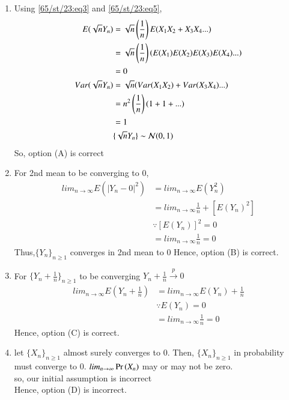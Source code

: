 \documentclass[journal,12pt,Twocolumn]{IEEEtran}
\theoremstyle{remark}
\begin{document}
\begin{enumerate}[label=(\Alph*)]
\item Using \eqref{65/st/23:eq3} and \eqref{65/st/23:eq5},
\begin{align}
E(\sqrt{n}Y_n) &= \sqrt{n}\left(\frac{1}{n}\right)E(X_1X_2+X_3X_4...) \\
&= \sqrt{n}\left(\frac{1}{n}\right)\left(E(X_1)E(X_2)E(X_3)E(X_4)...\right) \\
&= 0 \\
Var(\sqrt{n}Y_n) &= \sqrt{n}(Var(X_1X_2)+Var(X_3X_4)...) \\
&= n^2\left(\frac{1}{n}\right)(1+1+...) \\
&= 1 \\
& \{\sqrt{n}Y_n\} \sim \mathcal{N}(0,1)
\end{align}
So, option (A) is correct\
\item For 2nd mean to be converging to 0,
\begin{align}
lim_{n \to \infty} E(|Y_n-0|^2)&=lim_{n \to \infty} E(Y_n^2) \\
&=lim_{n \to \infty} \frac{1}{n} + [E(Y_n)^2] \\
&\because [E(Y_n)]^2 = 0 \\
&=lim_{n \to \infty} \frac{1}{n} = 0 
\end{align}
Thus,$\{Y_n\}_{n \geq 1}$ converges in 2nd mean to 0
Hence, option (B) is correct.
\item For $\{Y_n+\frac{1}{n}\}_{n \geq 1}$ to be converging $Y_n +\frac{1}{n} \xrightarrow{p} 0$  
\begin{align}
lim_{n \to \infty} E(Y_n+\frac{1}{n})&=lim_{n \to \infty} E(Y_n)+\frac{1}{n} \\
&\because E(Y_n) = 0 \\
&=lim_{n \to \infty} \frac{1}{n} = 0
\end{align}
Hence, option (C) is correct.
\item let $\{X_n\}_{n \geq 1}$ almost surely converges to $0$.
Then, $\{X_n\}_{n \geq 1}$ in probability must converge to $0$. 
$lim_{n \to \infty} \Pr\left(X_n\right)$ may or may not be zero. \\
so, our initial assumption is incorrect \\
Hence, option (D) is incorrect.
\end{enumerate}
\end{document}
